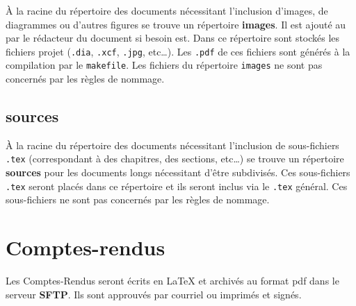 \`{A} la racine du répertoire des documents nécessitant l'inclusion d'images, de diagrammes ou
d'autres figures se trouve un répertoire \textbf{images}. Il est ajouté au \git{} par le
rédacteur du document si besoin est. Dans ce répertoire sont stockés les fichiers projet
(\verb+.dia+, \verb+.xcf+, \verb+.jpg+, etc\dots). Les \verb+.pdf+ de ces fichiers sont générés
à la compilation par le \verb+makefile+.
Les fichiers du répertoire \verb+images+ ne sont pas concernés par les règles de nommage.

\subsection{sources}

\`{A} la racine du répertoire des documents nécessitant l'inclusion de sous-fichiers \verb+.tex+
(correspondant à des chapitres, des sections, etc\dots) se trouve un répertoire \textbf{sources} pour
les documents longs nécessitant d'être subdivisés. 
Ces sous-fichiers \verb+.tex+ seront placés dans ce répertoire et ils seront inclus via
le \verb+.tex+ général. Ces sous-fichiers ne sont pas concernés par les règles de nommage.

\section{Comptes-rendus} \label{comptes-rendus}

Les Comptes-Rendus seront écrits en \LaTeX{} et archivés au format pdf dans le serveur \textbf{SFTP}. Ils sont approuvés par courriel ou imprimés et signés.

